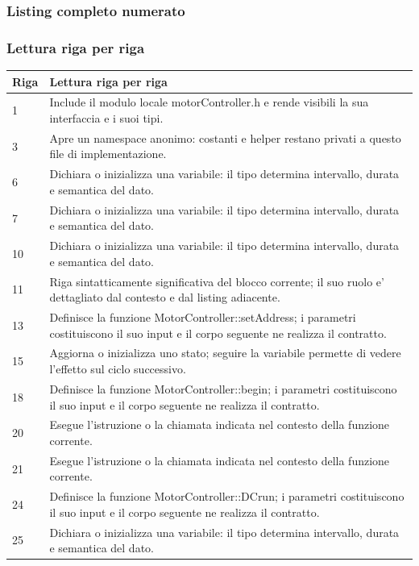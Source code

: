 \documentclass[11pt,a4paper]{article}
\begin{document}
\subsubsection{Listing completo numerato}


\subsubsection{Lettura riga per riga}
\begin{longtable}{p{}p{}}
\toprule
\textbf{Riga} & \textbf{Lettura riga per riga} \\
\midrule
\endhead
1 & Include il modulo locale motorController.h e rende visibili la sua interfaccia e i suoi tipi. \\
3 & Apre un namespace anonimo: costanti e helper restano privati a questo file di implementazione. \\
6 & Dichiara o inizializza una variabile: il tipo determina intervallo, durata e semantica del dato. \\
7 & Dichiara o inizializza una variabile: il tipo determina intervallo, durata e semantica del dato. \\
10 & Dichiara o inizializza una variabile: il tipo determina intervallo, durata e semantica del dato. \\
11 & Riga sintatticamente significativa del blocco corrente; il suo ruolo e' dettagliato dal contesto e dal listing adiacente. \\
13 & Definisce la funzione MotorController::setAddress; i parametri costituiscono il suo input e il corpo seguente ne realizza il contratto. \\
15 & Aggiorna o inizializza uno stato; seguire la variabile permette di vedere l'effetto sul ciclo successivo. \\
18 & Definisce la funzione MotorController::begin; i parametri costituiscono il suo input e il corpo seguente ne realizza il contratto. \\
20 & Esegue l'istruzione o la chiamata indicata nel contesto della funzione corrente. \\
21 & Esegue l'istruzione o la chiamata indicata nel contesto della funzione corrente. \\
24 & Definisce la funzione MotorController::DCrun; i parametri costituiscono il suo input e il corpo seguente ne realizza il contratto. \\
25 & Dichiara o inizializza una variabile: il tipo determina intervallo, durata e semantica del dato. \\

\end{longtable}
\end{document}
